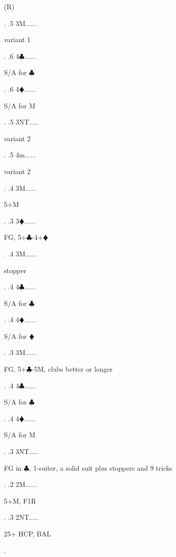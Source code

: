 \documentclass[a4paper]{article}
\newcommand{\BC}{\textcolor{OliveGreen}{$\clubsuit$}}
\newcommand{\BD}{\textcolor{RedOrange}{$\vardiamondsuit$}}
\begin{document}
{\begin{minipage}[t]{0.8\textwidth}
(R)
\end{minipage}. 
 .5 3M......\begin{minipage}[t]{0.8\textwidth}
variant 1
\end{minipage}. 
 .6 4\BC......\begin{minipage}[t]{0.8\textwidth}
S/A for \BC 
\end{minipage}. 
 .6 4\BD......\begin{minipage}[t]{0.8\textwidth}
S/A for M
\end{minipage}. 
 .5 3NT.....\begin{minipage}[t]{0.8\textwidth}
variant 2
\end{minipage}. 
 .5 4m......\begin{minipage}[t]{0.8\textwidth}
variant 2
\end{minipage}. 
 .4 3M......\begin{minipage}[t]{0.8\textwidth}
5+M
\end{minipage}. 
 .3 3\BD......\begin{minipage}[t]{0.8\textwidth}
FG, 5+\BC -4+\BD 
\end{minipage}. 
 .4 3M......\begin{minipage}[t]{0.8\textwidth}
stopper
\end{minipage}. 
 .4 4\BC......\begin{minipage}[t]{0.8\textwidth}
S/A for \BC 
\end{minipage}. 
 .4 4\BD......\begin{minipage}[t]{0.8\textwidth}
S/A for \BD 
\end{minipage}. 
 .3 3M......\begin{minipage}[t]{0.8\textwidth}
FG, 5+\BC -5M, clubs better or longer
\end{minipage}. 
 .4 4\BC......\begin{minipage}[t]{0.8\textwidth}
S/A for \BC 
\end{minipage}. 
 .4 4\BD......\begin{minipage}[t]{0.8\textwidth}
S/A for M
\end{minipage}. 
 .3 3NT.....\begin{minipage}[t]{0.8\textwidth}
FG in \BC , 1-suiter, a solid suit plus stoppers and 9 tricks
\end{minipage}. 
 .2 2M......\begin{minipage}[t]{0.8\textwidth}
5+M, F1R
\end{minipage}. 
 .3 2NT.....\begin{minipage}[t]{0.8\textwidth}
25+ HCP, BAL
\end{minipage}. 
}
\end{document}
